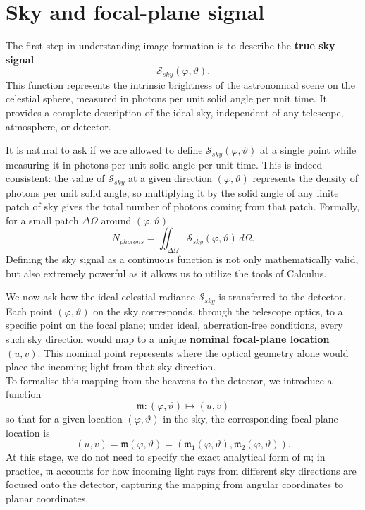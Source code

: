 \section{Sky and focal-plane signal}
The first step in understanding image formation is to describe the \textbf{true sky signal}
\[
    \mathcal{S}_{sky}(\varphi,\vartheta).
\]
This function represents the intrinsic brightness of the astronomical scene on the celestial sphere, measured in photons per unit solid angle per unit time.
It provides a complete description of the ideal sky, independent of any telescope, atmosphere, or detector.
\begin{tcolorbox}[colback=blue!5!white, colframe=blue!50!black, title=Technical note]
    It is natural to ask if we are allowed to define $\mathcal{S}_{sky}(\varphi,\vartheta)$ at a single point while measuring it in photons per unit solid angle per unit time. This is indeed consistent: the value of $\mathcal{S}_{sky}$ at a given direction $(\varphi,\vartheta)$ represents the density of photons per unit solid angle, so multiplying it by the solid angle of any finite patch of sky gives the total number of photons coming from that patch. Formally, for a small patch $\Delta\Omega$ around $(\varphi,\vartheta)$
    \[
    N_{photons}=\iint_{\Delta\Omega}\mathcal{S}_{sky}(\varphi,\vartheta)\,d\Omega.
    \]
    Defining the sky signal as a continuous function is not only mathematically valid, but also extremely powerful as it allows us to utilize the tools of Calculus.
\end{tcolorbox}\vspace{2mm}\noindent
We now ask how the ideal celestial radiance $\mathcal{S}_{sky}$ is transferred to the detector.
Each point $(\varphi,\vartheta)$ on the sky corresponds, through the telescope optics, to a specific point on the focal plane; under ideal, aberration-free conditions, every such sky direction would map to a unique \textbf{nominal focal-plane location} $(u,v)$.
This nominal point represents where the optical geometry alone would place the incoming light from that sky direction.
\\[\baselineskip]
To formalise this mapping from the heavens to the detector, we introduce a function
\[
    \boldsymbol{\mathfrak{m}}:(\varphi,\vartheta)\mapsto(u,v)
\]
so that for a given location $(\varphi,\vartheta)$ in the sky, the corresponding focal-plane location is
\[
    (u,v)=\boldsymbol{\mathfrak{m}}(\varphi,\vartheta)=\left(\mathfrak{m}_1(\varphi,\vartheta),\mathfrak{m}_2(\varphi,\vartheta)\right).
\]
At this stage, we do not need to specify the exact analytical form of $\boldsymbol{\mathfrak{m}}$; in practice, $\boldsymbol{\mathfrak{m}}$ accounts for how incoming light rays from different sky directions are focused onto the detector, capturing the mapping from angular coordinates to planar coordinates.\\[\baselineskip]
